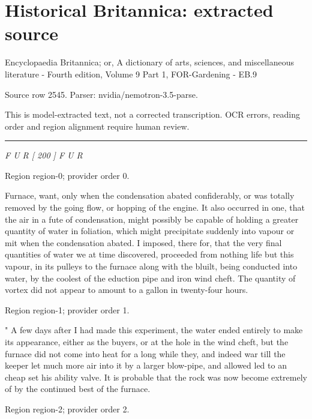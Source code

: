 \documentclass[11pt]{article}
\begin{document}
\section*{Historical Britannica: extracted source}
Encyclopaedia Britannica; or, A dictionary of arts, sciences, and miscellaneous literature - Fourth edition, Volume 9 Part 1, FOR-Gardening - EB.9\par
{\small Source row 2545. Parser: nvidia/nemotron-3.5-parse.\par}
{\small This is model-extracted text, not a corrected transcription. OCR errors, reading order and region alignment require human review.\par}
\hrule\medskip
{\small\itshape F U R [ 200 ] F U R\par}

{\scriptsize\color{gray} Region region-0; provider order 0.\par}
\medskip

Furnace, want, only when the condensation abated confiderably, or was totally removed by the going flow, or hopping of the engine. It also occurred in one, that the air in a fute of condensation, might possibly be capable of holding a greater quantity of water in foliation, which might precipitate suddenly into vapour or mit when the condensation abated. I imposed, there for, that the very final quantities of water we at time discovered, proceeded from nothing life but this vapour, in its pulleys to the furnace along with the bluilt, being conducted into water, by the coolest of the eduction pipe and iron wind cheft. The quantity of vortex did not appear to amount to a gallon in twenty-four hours.
\par

{\scriptsize\color{gray} Region region-1; provider order 1.\par}
\medskip

" A few days after I had made this experiment, the water ended entirely to make its appearance, either as the buyers, or at the hole in the wind cheft, but the furnace did not come into heat for a long while they, and indeed war till the keeper let much more air into it by a larger blow-pipe, and allowed led to an cheap set his ability valve. It is probable that the rock was now become extremely of by the continued best of the furnace.
\par

{\scriptsize\color{gray} Region region-2; provider order 2.\par}
\medskip
\end{document}
